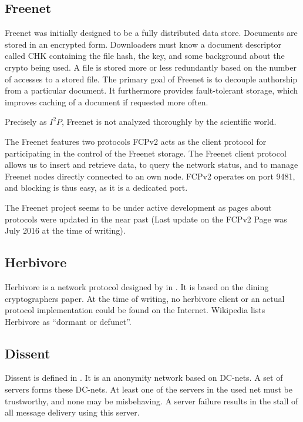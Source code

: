 \subsection{Freenet}
Freenet was initially designed to be a fully distributed data store\cite{freenet}. Documents are stored in an encrypted form. Downloaders must know a document descriptor called CHK containing the file hash, the key, and some background about the crypto being used. A file is stored more or less redundantly based on the number of accesses to a stored file. The primary goal of Freenet is to decouple authorship from a particular document. It furthermore provides fault-tolerant storage, which improves caching of a document if requested more often.

Precisely as $I^2P$, Freenet is not analyzed thoroughly by the scientific world. 

The Freenet features two protocols FCPv2 acts as the client protocol for participating in the control of the Freenet storage. The Freenet client protocol allows us to insert and retrieve data, to query the network status, and to manage Freenet nodes directly connected to an own node. FCPv2 operates on port 9481, and blocking is thus easy, as it is a dedicated port. 

The Freenet project seems to be under active development as pages about protocols were updated in the near past (Last update on the FCPv2 Page was July  2016 at the time of writing).

\subsection{Herbivore}
Herbivore is a network protocol designed by \citeauthor{herbivore:tr} in \cite{herbivore:tr}. It is based on the dining cryptographers paper\cite{chaum-dc}. At the time of writing, no herbivore client or an actual protocol implementation could be found on the Internet. Wikipedia lists Herbivore as ``dormant or defunct''.

\subsection{Dissent}
Dissent is defined in \cite{Corrigan-Gibbs:2010:DAA:1866307.1866346}. It is an anonymity network based on DC-nets. A set of servers forms these DC-nets. At least one of the servers in the used net must be trustworthy, and none may be misbehaving. A server failure results in the stall of all message delivery using this server.

